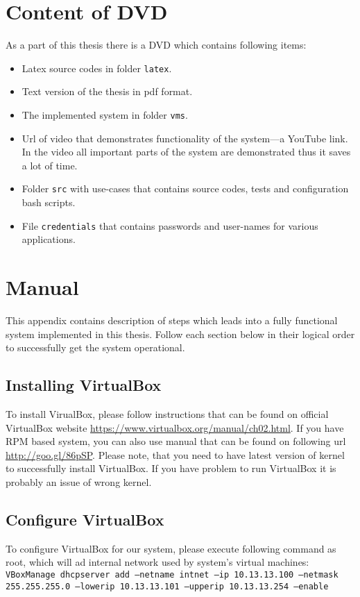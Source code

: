 \chapter{Content of DVD}
As a part of this thesis there is a DVD which contains following items:
\begin{itemize}
	\item Latex source codes in folder \texttt{latex}.
	\item Text version of the thesis in pdf format.
	\item The implemented system in folder \texttt{vms}.
	\item Url of video that demonstrates functionality of the system---a YouTube link. In the video all important parts of the system are demonstrated thus it saves a lot of time.
	\item Folder \texttt{src} with use-cases that contains source codes, tests and configuration bash scripts. 
	\item File \texttt{credentials} that contains passwords and user-names for various applications.
\end{itemize}

\chapter{Manual}
This appendix contains description of steps which leads into a fully functional system implemented in this thesis. Follow each section below in their logical order to successfully get the system operational.
\section{Installing VirtualBox}
To install VirualBox, please follow instructions that can be found on official VirtualBox website \url{https://www.virtualbox.org/manual/ch02.html}. If you have RPM based system, you can also use manual that can be found on following url \url{http://goo.gl/86pSP}. Please note, that you need to have latest version of kernel to successfully install VirtualBox. If you have problem to run VirtualBox it is probably an issue of wrong kernel.
\section{Configure VirtualBox}
To configure VirtualBox for our system, please execute following command as root, which will ad internal network used by system's virtual machines: \texttt{VBoxManage dhcpserver add --netname intnet --ip 10.13.13.100 --netmask 255.255.255.0 --lowerip 10.13.13.101 --upperip 10.13.13.254 --enable}
